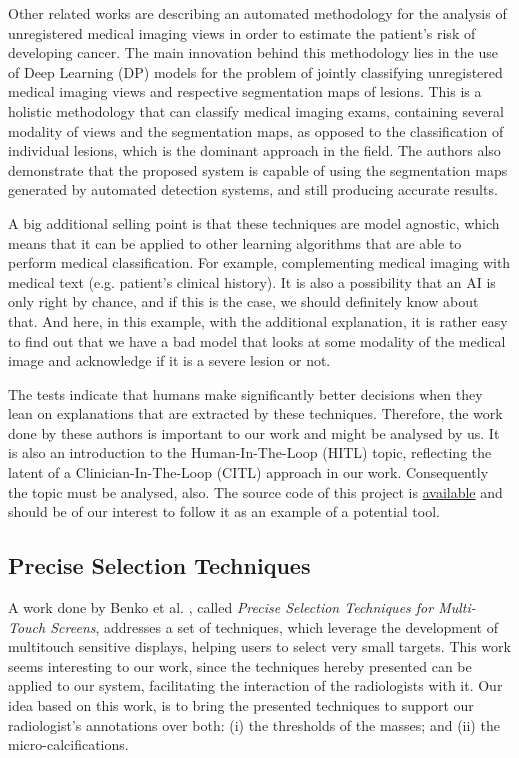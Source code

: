 Other related works \cite{giger2013breast, carneiro2017automated} are describing an automated methodology for the analysis of unregistered medical imaging views in order to estimate the patient's risk of developing cancer. The main innovation behind this methodology lies in the use of Deep Learning (DP) models for the problem of jointly classifying unregistered medical imaging views and respective segmentation maps of lesions. This is a holistic methodology that can classify medical imaging exams, containing several modality of views and the segmentation maps, as opposed to the classification of individual lesions, which is the dominant approach in the field. The authors also demonstrate that the proposed system is capable of using the segmentation maps generated by automated detection systems, and still producing accurate results.

\clearpage

A big additional selling point is that these techniques are model agnostic, which means that it can be applied to other learning algorithms that are able to perform medical classification. For example, complementing medical imaging with medical text (e.g. patient's clinical history). It is also a possibility that an AI is only right by chance, and if this is the case, we should definitely know about that. And here, in this example, with the additional explanation, it is rather easy to find out that we have a bad model that looks at some modality of the medical image and acknowledge if it is a severe lesion or not.

The tests indicate that humans make significantly better decisions when they lean on explanations that are extracted by these techniques. Therefore, the work done by these authors is important to our work and might be analysed by us. It is also an introduction to the Human-In-The-Loop (HITL) topic, reflecting the latent of a Clinician-In-The-Loop (CITL) approach in our work. Consequently the topic must be analysed, also. The source code of this project is \href{https://github.com/marcotcr/lime}{available} and should be of our interest to follow it as an example of a potential tool.

\subsection{Precise Selection Techniques}

A work done by Benko et al. \cite{benko2006precise}, called \textit{Precise Selection Techniques for Multi-Touch Screens}, addresses a set of techniques, which leverage the development of multitouch sensitive displays, helping users to select very small targets. This work seems interesting to our work, since the techniques hereby presented can be applied to our system, facilitating the interaction of the radiologists with it. Our idea based on this work, is to bring the presented techniques to support our radiologist's annotations over both: (i) the thresholds of the masses; and (ii) the micro-calcifications.

